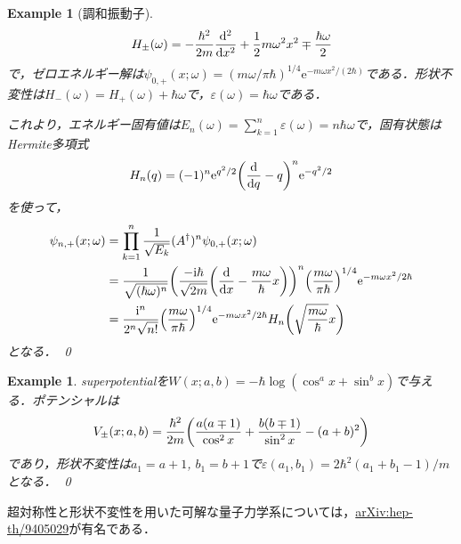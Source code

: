 \documentclass[english, dvipdfmx, a4paper]{jsarticle}
\theoremstyle{break}
\newtheorem{eg}[thm]{Example}
\renewcommand{\i}{\mathrm{i}}
\newcommand{\e}{\mathrm{e}}
\begin{document}
	\begin{eg}[調和振動子]
		\begin{equation}
			H_{\pm} (\omega) =- \frac{\hbar^2}{2m} \dv[2]{}{x} + \frac{1}{2}m\omega^2x^2\mp\frac{\hbar\omega}{2}
		\end{equation}
		で，ゼロエネルギー解は$\psi_{0, +}(x; \omega) = (m\omega/\pi \hbar)^{1/4}\e^{-m\omega x^2/(2\hbar)}$である．形状不変性は$H_-(\omega) = H_+(\omega) + \hbar\omega$で，$\varepsilon(\omega) = \hbar\omega$である．

		これより，エネルギー固有値は$E_n(\omega) = \sum_{k=1}^{n}\varepsilon(\omega) = n\hbar\omega$で，固有状態はHermite多項式
		\begin{equation}
			H_n(q) = (-1)^n\e^{q^2/2}\qty(\dv{}{q} - q)^n\e^{-q^2/2}
		\end{equation}
		を使って，
		\begin{align}
			\psi_{n, +}(x; \omega) &= \prod_{k=1}^{n}\frac{1}{\sqrt{E_k}}(A^{\dagger})^n\psi_{0, +}(x; \omega)\\
								   &= \frac{1}{\sqrt{(\hbar\omega)^n}}\qty(\frac{-\i\hbar}{\sqrt{2m}}\qty(\dv{}{x} - \frac{m\omega}{\hbar}x))^n\qty(\frac{m\omega}{\pi\hbar})^{1/4}\e^{-m\omega x^2/2\hbar}\\
								   &= \frac{\i^n}{2^n\sqrt{n!}}\qty(\frac{m\omega}{\pi\hbar})^{1/4}\e^{-m\omega x^2/2\hbar}H_n\qty(\sqrt{\frac{m\omega}{\hbar}}x)
		\end{align}
		となる．
		\qed
	\end{eg}
	\begin{eg}
		superpotentialを$W(x; a, b) = -\hbar \log(\cos^ax + \sin^bx)$で与える．ポテンシャルは
		\begin{equation}
			V_{\pm}(x; a, b) = \frac{\hbar^2}{2m}\qty(\frac{a(a\mp1)}{\cos^2x} + \frac{b(b\mp1)}{\sin^2x} - (a+b)^2)
		\end{equation}
		であり，形状不変性は$a_1=a+1$, $b_1 = b+1$で$\varepsilon(a_1, b_1) = 2\hbar^2(a_1+b_1-1)/m$となる．
		\qed
	\end{eg}
	超対称性と形状不変性を用いた可解な量子力学系については，\href{https://arxiv.org/abs/hep-th/9405029}{arXiv:hep-th/9405029}が有名である．
\end{document}
